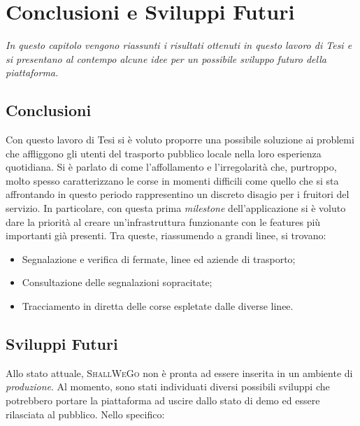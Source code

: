 \chapter{Conclusioni e Sviluppi Futuri} %
%


\begin{citazione}
	\textit{In questo capitolo vengono riassunti i risultati ottenuti in questo lavoro di Tesi e si presentano al contempo alcune idee per un possibile sviluppo futuro della piattaforma.}
\end{citazione}

\newpage

\section{Conclusioni}
	Con questo lavoro di Tesi si è voluto proporre una possibile soluzione ai problemi che affliggono gli utenti del trasporto pubblico locale nella loro esperienza quotidiana. Si è parlato di come l'affollamento e l'irregolarità che, purtroppo, molto spesso caratterizzano le corse in momenti difficili come quello che si sta affrontando in questo periodo rappresentino un discreto disagio per i fruitori del servizio. In particolare, con questa prima \textit{milestone} dell'applicazione si è voluto dare la priorità al creare un'infrastruttura funzionante con le features più importanti già presenti. Tra queste, riassumendo a grandi linee, si trovano: 
	\begin{itemize}
		\item Segnalazione e verifica di fermate, linee ed aziende di trasporto;
		\item Consultazione delle segnalazioni sopracitate;
		\item Tracciamento in diretta delle corse espletate dalle diverse linee.
	\end{itemize}

	\section{Sviluppi Futuri}
		Allo stato attuale, \textsc{ShallWeGo} non è pronta ad essere inserita in un ambiente di \textit{produzione}. Al momento, sono stati individuati diversi possibili sviluppi che potrebbero portare la piattaforma ad uscire dallo stato di demo ed essere rilasciata al pubblico. Nello specifico: 

